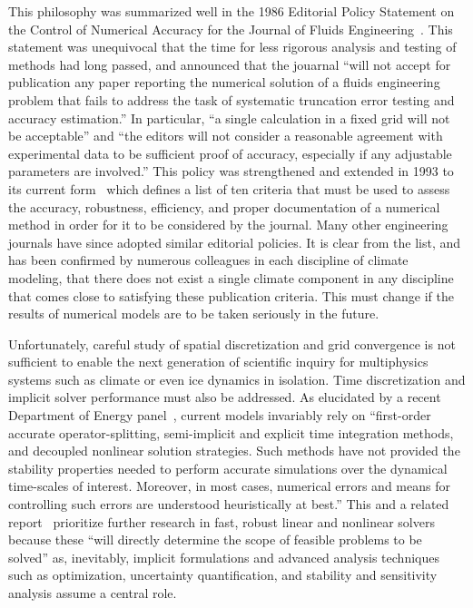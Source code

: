 This philosophy was summarized well in the 1986 Editorial Policy Statement on the Control of Numerical Accuracy for the Journal of Fluids Engineering~\cite{roache1986editorial}.
This statement was unequivocal that the time for less rigorous analysis and testing of methods had long passed, and announced that the jouarnal ``will not accept for publication any paper reporting the numerical solution of a fluids engineering problem that fails to address the task of systematic truncation error testing and accuracy estimation.''
In particular, ``a single calculation in a fixed grid will not be acceptable'' and ``the editors will not consider a reasonable agreement with experimental data to be sufficient proof of accuracy, especially if any adjustable parameters are involved.''
This policy was strengthened and extended in 1993 to its current form~\cite{jfe2004numaccuracy} which defines a list of ten criteria that must be used to assess the accuracy, robustness, efficiency, and proper documentation of a numerical method in order for it to be considered by the journal.
Many other engineering journals have since adopted similar editorial policies.
It is clear from the list, and has been confirmed by numerous colleagues in each discipline of climate modeling, that there does not exist a single climate component in any discipline that comes close to satisfying these publication criteria.
This must change if the results of numerical models are to be taken seriously in the future.

Unfortunately, careful study of spatial discretization and grid convergence is not sufficient to enable the next generation of scientific inquiry for multiphysics systems such as climate or even ice dynamics in isolation.
Time discretization and implicit solver performance must also be addressed.
As elucidated by a recent Department of Energy panel~\cite{simon2007modeling}, current models invariably rely on ``first-order accurate operator-splitting, semi-implicit and explicit time integration methods, and decoupled nonlinear solution strategies.
Such methods have not provided the stability properties needed to perform accurate simulations over the dynamical time-scales of interest.
Moreover, in most cases, numerical errors and means for controlling such errors are understood heuristically at best.''
This and a related report~\cite{washington2009scientific} prioritize further research in fast, robust linear and nonlinear solvers because these ``will directly determine the scope of feasible problems to be solved'' as, inevitably, implicit formulations and advanced analysis techniques such as optimization, uncertainty quantification, and stability and sensitivity analysis assume a central role.

